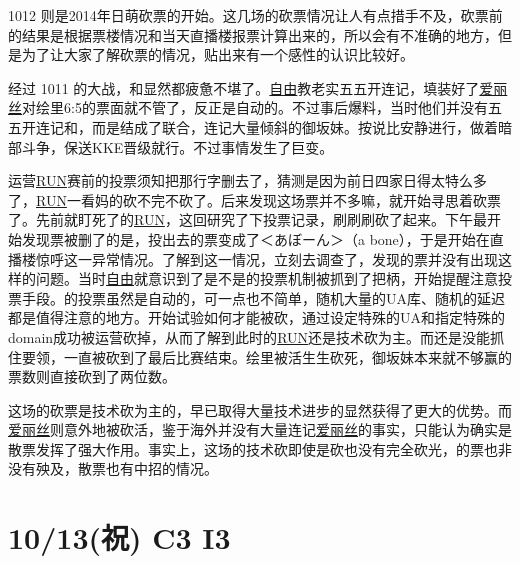 1012 则是2014年日萌砍票的开始。这几场的砍票情况让人有点措手不及，砍票前的结果是根据票楼情况和当天直播楼报票计算出来的，所以会有不准确的地方，但是为了让大家了解砍票的情况，贴出来有一个感性的认识比较好。

经过 1011 的大战，和显然都疲惫不堪了。\uline{自由}教老实五五开连记，填装好了\uline{爱丽丝}对绘里6:5的票面就不管了，反正是自动的。不过事后爆料，当时他们并没有五五开连记和，而是结成了联合，连记大量倾斜的御坂妹。按说比安静进行，做着暗部斗争，保送KKE晋级就行。不过事情发生了巨变。

运营\uline{RUN}赛前的投票须知把那行字删去了，猜测是因为前日四家日得太特么多了，\uline{RUN}一看妈的砍不完不砍了。后来发现这场票并不多嘛，就开始寻思着砍票了。先前就盯死了的\uline{RUN}，这回研究了下投票记录，刷刷刷砍了起来。下午最开始发现票被删了的是，投出去的票变成了{\mincho ＜あぼーん＞}（a bone），于是开始在直播楼惊呼这一异常情况。了解到这一情况，立刻去调查了，发现的票并没有出现这样的问题。当时\uline{自由}就意识到了是不是的投票机制被抓到了把柄，开始提醒注意投票手段。的投票虽然是自动的，可一点也不简单，随机大量的UA库、随机的延迟都是值得注意的地方。开始试验如何才能被砍，通过设定特殊的UA和指定特殊的domain成功被运营砍掉，从而了解到此时的\uline{RUN}还是技术砍为主。而还是没能抓住要领，一直被砍到了最后比赛结束。绘里被活生生砍死，御坂妹本来就不够赢的票数则直接砍到了两位数。

这场的砍票是技术砍为主的，早已取得大量技术进步的显然获得了更大的优势。而\uline{爱丽丝}则意外地被砍活，鉴于海外并没有大量连记\uline{爱丽丝}的事实，只能认为确实是散票发挥了强大作用。事实上，这场的技术砍即使是砍也没有完全砍光，的票也非没有殃及，散票也有中招的情况。

\section{10/13(祝) C3 I3}


